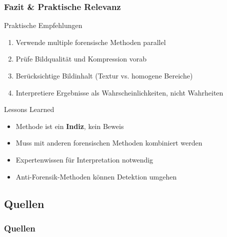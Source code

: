 \documentclass[11pt,t,usepdftitle=false,aspectratio=169]{beamer}
\begin{document}
\begin{frame}
	\frametitle{Fazit \& Praktische Relevanz}
	
	\begin{alertblock}{Praktische Empfehlungen}
		\begin{enumerate}
			\item Verwende multiple forensische Methoden parallel
			\item Prüfe Bildqualität und Kompression vorab
			\item Berücksichtige Bildinhalt (Textur vs. homogene Bereiche)
			\item Interpretiere Ergebnisse als Wahrscheinlichkeiten, nicht Wahrheiten
		\end{enumerate}
	\end{alertblock}
    
    \begin{block}{Lessons Learned}
        \begin{itemize}
            \item Methode ist ein \textbf{Indiz}, kein Beweis
            \item Muss mit anderen forensischen Methoden kombiniert werden
            \item Expertenwissen für Interpretation notwendig
            \item Anti-Forensik-Methoden können Detektion umgehen~\cite{kirchner_hiding_2008}
        \end{itemize}
    \end{block}
\end{frame}

\subsection{Quellen}
\begin{frame}
    \frametitle{Quellen}
    \begingroup
    \setlength{\bibitemsep}{2pt}
    \setlength{\itemsep}{0pt}
    \setlength{\parskip}{0pt}
    \renewcommand{\bibfont}{\tiny}
    \printbibliography[heading=none]
    \endgroup
\end{frame}
\end{document}

